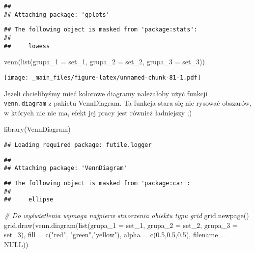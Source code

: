 \documentclass[
]{book}
\newenvironment{Shaded}{\begin{snugshade}}{\end{snugshade}}
\newcommand{\AttributeTok}[1]{\textcolor[rgb]{0.77,0.63,0.00}{#1}}
\newcommand{\CommentTok}[1]{\textcolor[rgb]{0.56,0.35,0.01}{\textit{#1}}}
\newcommand{\ConstantTok}[1]{\textcolor[rgb]{0.00,0.00,0.00}{#1}}
\newcommand{\FloatTok}[1]{\textcolor[rgb]{0.00,0.00,0.81}{#1}}
\newcommand{\FunctionTok}[1]{\textcolor[rgb]{0.00,0.00,0.00}{#1}}
\newcommand{\NormalTok}[1]{#1}
\newcommand{\StringTok}[1]{\textcolor[rgb]{0.31,0.60,0.02}{#1}}
\begin{document}
\begin{verbatim}
## 
## Attaching package: 'gplots'
\end{verbatim}

\begin{verbatim}
## The following object is masked from 'package:stats':
## 
##     lowess
\end{verbatim}

\begin{Shaded}
\begin{Highlighting}[]
\FunctionTok{venn}\NormalTok{(}\FunctionTok{list}\NormalTok{(}\AttributeTok{grupa\_1 =}\NormalTok{ set\_1, }\AttributeTok{grupa\_2 =}\NormalTok{ set\_2, }\AttributeTok{grupa\_3 =}\NormalTok{ set\_3))}
\end{Highlighting}
\end{Shaded}

\texttt{[image: \_main\_files/figure-latex/unnamed-chunk-81-1.pdf]}

Jeżeli chcielibyśmy mieć kolorowe diagramy należałoby użyć funkcji \texttt{venn.diagram} z pakietu VennDiagram. Ta funkcja stara się nie rysować obszarów, w których nic nie ma, efekt jej pracy jest również ładniejszy ;)

\begin{Shaded}
\begin{Highlighting}[]
\FunctionTok{library}\NormalTok{(VennDiagram)}
\end{Highlighting}
\end{Shaded}

\begin{verbatim}
## Loading required package: futile.logger
\end{verbatim}

\begin{verbatim}
## 
## Attaching package: 'VennDiagram'
\end{verbatim}

\begin{verbatim}
## The following object is masked from 'package:car':
## 
##     ellipse
\end{verbatim}

\begin{Shaded}
\begin{Highlighting}[]
\CommentTok{\# Do wyświetlenia wymaga najpierw stworzenia obiektu typu grid}
\FunctionTok{grid.newpage}\NormalTok{()}
\FunctionTok{grid.draw}\NormalTok{(}\FunctionTok{venn.diagram}\NormalTok{(}\FunctionTok{list}\NormalTok{(}\AttributeTok{grupa\_1 =}\NormalTok{ set\_1, }\AttributeTok{grupa\_2 =}\NormalTok{ set\_2, }\AttributeTok{grupa\_3 =}\NormalTok{ set\_3), }
                       \AttributeTok{fill =} \FunctionTok{c}\NormalTok{(}\StringTok{"red"}\NormalTok{, }\StringTok{"green"}\NormalTok{,}\StringTok{"yellow"}\NormalTok{), }
                       \AttributeTok{alpha =} \FunctionTok{c}\NormalTok{(}\FloatTok{0.5}\NormalTok{,}\FloatTok{0.5}\NormalTok{,}\FloatTok{0.5}\NormalTok{), }
                       \AttributeTok{filename =} \ConstantTok{NULL}\NormalTok{))}
\end{Highlighting}
\end{Shaded}
\end{document}
